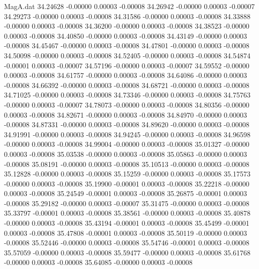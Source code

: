 \begin{filecontents}{MagA.dat}
  34.24628   -0.00000    0.00003   -0.00008
  34.26942   -0.00000    0.00003   -0.00007
  34.29273   -0.00000    0.00003   -0.00008
  34.31586   -0.00000    0.00003   -0.00008
  34.33888   -0.00000    0.00003   -0.00008
  34.36200   -0.00000    0.00003   -0.00008
  34.38523   -0.00000    0.00003   -0.00008
  34.40850   -0.00000    0.00003   -0.00008
  34.43149   -0.00000    0.00003   -0.00008
  34.45467   -0.00000    0.00003   -0.00008
  34.47801   -0.00000    0.00003   -0.00008
  34.50098   -0.00000    0.00003   -0.00008
  34.52405   -0.00000    0.00003   -0.00008
  34.54874   -0.00001    0.00003   -0.00007
  34.57196   -0.00000    0.00003   -0.00007
  34.59552   -0.00000    0.00003   -0.00008
  34.61757   -0.00000    0.00003   -0.00008
  34.64086   -0.00000    0.00003   -0.00008
  34.66392   -0.00000    0.00003   -0.00008
  34.68721   -0.00000    0.00003   -0.00008
  34.71025   -0.00000    0.00003   -0.00008
  34.73346   -0.00000    0.00003   -0.00008
  34.75763   -0.00000    0.00003   -0.00007
  34.78073   -0.00000    0.00003   -0.00008
  34.80356   -0.00000    0.00003   -0.00008
  34.82671   -0.00000    0.00003   -0.00008
  34.84970   -0.00000    0.00003   -0.00008
  34.87331   -0.00000    0.00003   -0.00008
  34.89620   -0.00000    0.00003   -0.00008
  34.91991   -0.00000    0.00003   -0.00008
  34.94245   -0.00000    0.00003   -0.00008
  34.96598   -0.00000    0.00003   -0.00008
  34.99004   -0.00000    0.00003   -0.00008
  35.01327   -0.00000    0.00003   -0.00008
  35.03538   -0.00000    0.00003   -0.00008
  35.05863   -0.00000    0.00003   -0.00008
  35.08191   -0.00000    0.00003   -0.00008
  35.10513   -0.00000    0.00003   -0.00008
  35.12828   -0.00000    0.00003   -0.00008
  35.15259   -0.00000    0.00003   -0.00008
  35.17573   -0.00000    0.00003   -0.00008
  35.19900   -0.00001    0.00003   -0.00008
  35.22218   -0.00000    0.00003   -0.00008
  35.24549   -0.00001    0.00003   -0.00008
  35.26875   -0.00001    0.00003   -0.00008
  35.29182   -0.00000    0.00003   -0.00007
  35.31475   -0.00000    0.00003   -0.00008
  35.33797   -0.00001    0.00003   -0.00008
  35.38561   -0.00000    0.00003   -0.00008
  35.40878   -0.00000    0.00003   -0.00008
  35.43194   -0.00001    0.00003   -0.00008
  35.45499   -0.00001    0.00003   -0.00008
  35.47808   -0.00001    0.00003   -0.00008
  35.50119   -0.00000    0.00003   -0.00008
  35.52446   -0.00000    0.00003   -0.00008
  35.54746   -0.00001    0.00003   -0.00008
  35.57059   -0.00000    0.00003   -0.00008
  35.59477   -0.00000    0.00003   -0.00008
  35.61768   -0.00000    0.00003   -0.00008
  35.64085   -0.00000    0.00003   -0.00008

\end{filecontents}
